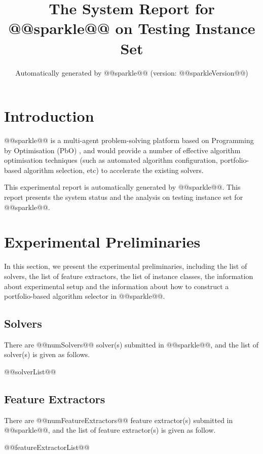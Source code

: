 \documentclass[british]{article}
\title{The System Report for @@sparkle@@ on Testing Instance Set}
\author{ Automatically generated by @@sparkle@@ (version: @@sparkleVersion@@) }
\begin{document}
\maketitle %


\section{Introduction}
\label{sec:Introduction}

@@sparkle@@ \cite{Hoos15} is a multi-agent problem-solving platform based on Programming by Optimisation (PbO) \cite{Hoos12}, and would provide a number of effective algorithm optimisation techniques (such as automated algorithm configuration, portfolio-based algorithm selection, etc) to accelerate the existing solvers.

This experimental report is automatically generated by @@sparkle@@. This report presents the system status and the analysis on testing instance set for @@sparkle@@.


\section{Experimental Preliminaries}
\label{sec:Experimental_Preliminaries}

In this section, we present the experimental preliminaries, including the list of solvers, the list of feature extractors, the list of instance classes, the information about experimental setup and the information about how to construct a portfolio-based algorithm selector in @@sparkle@@.

\subsection{Solvers}
\label{sec:Solvers}
There are @@numSolvers@@ solver(s) submitted in @@sparkle@@, and the list of solver(s) is given as follows.


\begin{enumerate} 
@@solverList@@
\end{enumerate}


\subsection{Feature Extractors}
\label{sec:Feature_Extractors}
There are @@numFeatureExtractors@@ feature extractor(s) submitted in @@sparkle@@, and the list of feature extractor(s) is given as follow.

\begin{enumerate}
@@featureExtractorList@@
\end{enumerate}
\end{document}
